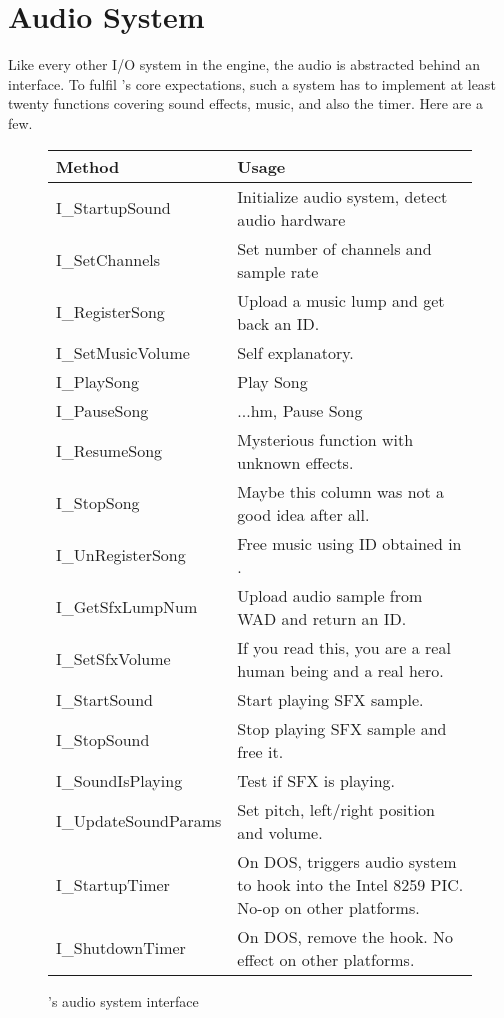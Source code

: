 \section{Audio System}
\label{dmx_section}
Like every other I/O system in the engine, the audio is abstracted behind an interface. To fulfil \doom's core expectations, such a system has to implement at least twenty functions covering sound effects, music, and also the timer. Here are a few.\\
\par
 \begin{figure}[H]
\centering  
\begin{tabularx}{\textwidth}{ L{0.57}  L{1.43}}
  \toprule
  \textbf{Method} &  \textbf{Usage}\\

  \toprule 
  I\_StartupSound & Initialize audio system, detect audio hardware\\
  I\_SetChannels & Set number of channels and sample rate\\
  \toprule 
   
I\_RegisterSong & Upload a music lump and get back an ID.\\
I\_SetMusicVolume & Self explanatory.\\
I\_PlaySong & Play Song\\
I\_PauseSong & ...hm, Pause Song\\
I\_ResumeSong & Mysterious function with unknown effects.\\
I\_StopSong & Maybe this column was not a good idea after all.\\
I\_UnRegisterSong & Free music using ID obtained in .\\




  \toprule 
I\_GetSfxLumpNum & Upload audio sample from WAD and return an ID.\\
I\_SetSfxVolume & If you read this, you are a real human being and a real hero.\\
I\_StartSound & Start playing SFX sample.\\
I\_StopSound & Stop playing SFX sample and free it.\\
I\_SoundIsPlaying & Test if SFX is playing.\\
I\_UpdateSoundParams & Set pitch, left/right position and volume.\\

  \toprule 
  
I\_StartupTimer & On DOS, triggers audio system to hook into the Intel 8259 PIC. No-op on other platforms.\\
I\_ShutdownTimer & On DOS, remove the hook.  No effect on other platforms.\\

   \toprule
\end{tabularx}
\caption{\doom{}'s audio system interface}
\end{figure}



